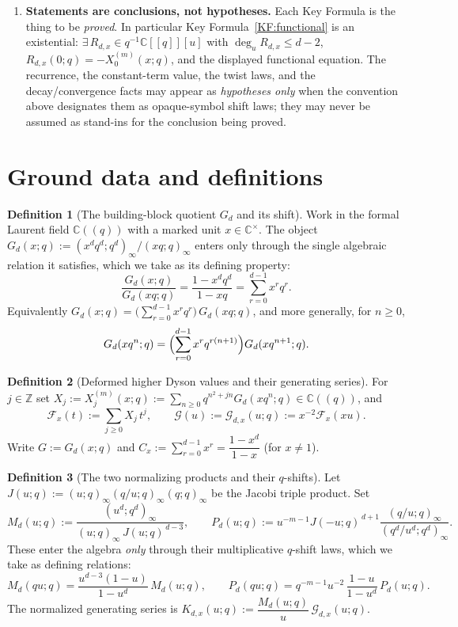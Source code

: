 \documentclass[11pt]{article}
\newcommand{\C}{\mathbb{C}}
\newcommand{\Z}{\mathbb{Z}}
\newcommand{\GG}{\mathcal{G}}
\newcommand{\FF}{\mathcal{F}}
\theoremstyle{definition}
\newtheorem{defn}{Definition}
\begin{document}
\begin{enumerate}
\item[(C6)] \textbf{Statements are conclusions, not hypotheses.} Each Key Formula is the thing
to be \emph{proved}. In particular Key Formula~\ref{KF:functional} is an existential:
$\exists\,R_{d,x}\in q^{-1}\C[[q]][u]$ with $\deg_u R_{d,x}\le d-2$, $R_{d,x}(0;q)=-X_0^{(m)}(x;q)$,
and the displayed functional equation. The recurrence, the constant-term value, the twist
laws, and the decay/convergence facts may appear as \emph{hypotheses only} when the
convention above designates them as opaque-symbol shift laws; they may never be assumed as
stand-ins for the conclusion being proved.
\end{enumerate}

\section*{Ground data and definitions}

\begin{defn}[The building-block quotient $G_d$ and its shift]\label{def:G}
Work in the formal Laurent field $\C((q))$ with a marked unit $x\in\C^\times$. The object
$G_d(x;q):=(x^dq^d;q^d)_\infty/(xq;q)_\infty$ enters only through the single algebraic relation
it satisfies, which we take as its defining property:
\[
\frac{G_d(x;q)}{G_d(xq;q)}=\frac{1-x^dq^d}{1-xq}
=\sum_{r=0}^{d-1}x^rq^r .
\]
Equivalently $G_d(x;q)=\bigl(\sum_{r=0}^{d-1}x^rq^r\bigr)\,G_d(xq;q)$, and more generally, for
$n\ge0$,
\[
G_d(xq^n;q)=\Bigl(\sum_{r=0}^{d-1}x^rq^{r(n+1)}\Bigr)G_d(xq^{n+1};q).
\]
\end{defn}

\begin{defn}[Deformed higher Dyson values and their generating series]\label{def:X}
For $j\in\Z$ set $X_j:=X_j^{(m)}(x;q):=\sum_{n\ge0}q^{n^2+jn}G_d(xq^n;q)\in\C((q))$, and
\[
\FF_x(t):=\sum_{j\ge0}X_j\,t^j,
\qquad
\GG(u):=\GG_{d,x}(u;q):=x^{-2}\FF_x(xu).
\]
Write $G:=G_d(x;q)$ and $C_x:=\sum_{r=0}^{d-1}x^r=\dfrac{1-x^d}{1-x}$ (for $x\ne1$).
\end{defn}

\begin{defn}[The two normalizing products and their $q$-shifts]\label{def:MP}
Let $J(u;q):=(u;q)_\infty(q/u;q)_\infty(q;q)_\infty$ be the Jacobi triple product. Set
\[
M_d(u;q):=\frac{(u^d;q^d)_\infty}{(u;q)_\infty\,J(u;q)^{\,d-3}},
\qquad
P_d(u;q):=u^{-m-1}J(-u;q)^{\,d+1}\frac{(q/u;q)_\infty}{(q^d/u^d;q^d)_\infty}.
\]
These enter the algebra \emph{only} through their multiplicative $q$-shift laws, which we take
as defining relations:
\[
M_d(qu;q)=\frac{u^{d-3}(1-u)}{1-u^d}\,M_d(u;q),
\qquad
P_d(qu;q)=q^{-m-1}u^{-2}\,\frac{1-u}{1-u^d}\,P_d(u;q).
\]
The normalized generating series is $K_{d,x}(u;q):=\dfrac{M_d(u;q)}{u}\,\GG_{d,x}(u;q)$.
\end{defn}
\end{document}
